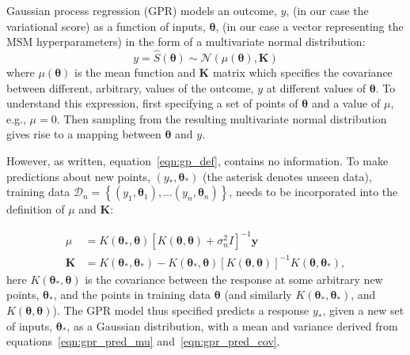 Gaussian process regression (GPR) models an outcome, $y$, (in our case the variational score) as a function of inputs, $\bm{\theta}$, (in our case a vector representing the MSM hyperparameters) in the form of a multivariate normal distribution: 
\begin{equation}
   y = \hat{S}(\bm{\theta}) \sim \mathcal{N}\left(\mu(\bm{\theta}), \mathbf{K}\right ) \label{eqn:gp_def}
\end{equation}
where $\mu(\bm{\theta})$ is the mean function and $\mathbf{K}$ matrix which specifies the covariance between different, arbitrary, values of the outcome, $y$ at different values of $\bm{\theta}$. To understand this expression, first specifying a set of points of $\bm{\theta}$ and a value of $\mu$, e.g., $\mu=0$. Then sampling from the resulting multivariate normal distribution gives rise to a mapping between $\bm{\theta}$ and $y$.

However, as written, equation~\ref{eqn:gp_def}, contains no information.  To make predictions about new points, $(y_{*}, \bm{\theta}_{*})$ (the asterisk denotes unseen data), training data $\mathcal{D}_{n}=\left\{(y_1, \bm{\theta}_1),  \ldots (y_n, \bm{\theta}_n) \right \}$,  needs to be incorporated into the definition of  $\mu$ and $\mathbf{K}$:  

$$
\begin{aligned}
\mu & =K\left(\bm{\theta}_*, \bm{\theta}\right)\left[K(\bm{\theta}, \bm{\theta})+\sigma_n^2 I\right]^{-1} \mathbf{y} \label{eqn:gpr_pred_mu} \\
\mathbf{K} &=K\left(\bm{\theta}_*, \bm{\theta}_*\right)-K\left(\bm{\theta}_*, \bm{\theta}\right)\left[K(\bm{\theta}, \bm{\theta})\right]^{-1} K\left(\bm{\theta}, \bm{\theta}_*\right), \label{eqn:gpr_pred_cov}
\end{aligned}
$$
here $K\left(\bm{\theta}_*, \bm{\theta}\right)$ is the covariance between the response at some arbitrary new points, $\bm{\theta}_*$, and the points in training data $\bm{\theta}$ (and similarly $K\left(\bm{\theta}_*, \bm{\theta}_*\right)$, and $K\left(\bm{\theta}, \bm{\theta}\right)$). The GPR model thus specified predicts a response $y_*$, given a new set of inputs, $\bm{\theta}_*$, as a Gaussian distribution, with a mean and variance derived from equations~\ref{eqn:gpr_pred_mu} and~\ref{eqn:gpr_pred_cov}. 

